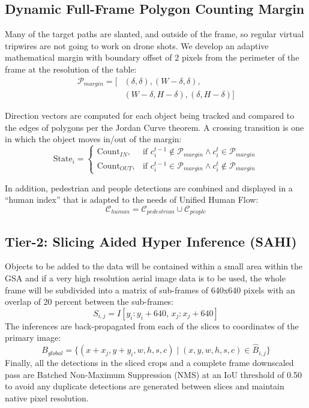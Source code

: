 \documentclass[conference]{IEEEtran}
\begin{document}
\subsection{Dynamic Full-Frame Polygon Counting Margin}
Many of the target paths are slanted, and outside of the frame, so regular virtual tripwires are not going to work on drone shots. We develop an adaptive mathematical margin with boundary offset of 2 pixels from the perimeter of the frame at the resolution of the table:
\begin{equation}
\begin{split}
\mathcal{P}_{margin} = \big[ &(\delta, \delta), (W - \delta, \delta), \\
&(W - \delta, H - \delta), (\delta, H - \delta) \big]
\end{split}
\end{equation}

Direction vectors are computed for each object being tracked and compared to the edges of polygons per the Jordan Curve theorem. A crossing transition is one in which the object moves in/out of the margin:
\begin{equation}
\text{State}_i = 
\begin{cases}
\text{Count}_{IN}, & \text{if } c_i^{t-1} \notin \mathcal{P}_{margin} \land c_i^t \in \mathcal{P}_{margin} \\
\text{Count}_{OUT}, & \text{if } c_i^{t-1} \in \mathcal{P}_{margin} \land c_i^t \notin \mathcal{P}_{margin}
\end{cases}
\end{equation}

In addition, pedestrian and people detections are combined and displayed in a ``human index'' that is adapted to the needs of Unified Human Flow:
\begin{equation}
\mathcal{C}_{human} = \mathcal{C}_{pedestrian} \cup \mathcal{C}_{people}
\end{equation}

\subsection{Tier-2: Slicing Aided Hyper Inference (SAHI)}
Objects to be added to the data will be contained within a small area within the GSA and if a very high resolution aerial image data is to be used, the whole frame will be subdivided into a matrix of sub-frames of 640x640 pixels with an overlap of 20 percent between the sub-frames:
\begin{equation}
S_{i,j} = I[y_i : y_i + 640, \, x_j : x_j + 640]
\end{equation}
The inferences are back-propagated from each of the slices to coordinates of the primary image:
\begin{equation}
B_{global} = \{ (x + x_j, y + y_i, w, h, s, c) \mid (x, y, w, h, s, c) \in \hat{B}_{i,j} \}
\end{equation}
Finally, all the detections in the sliced crops and a complete frame downscaled pass are Batched Non-Maximum Suppression (NMS) at an IoU threshold of 0.50 to avoid any duplicate detections are generated between slices and maintain native pixel resolution.
\end{document}
